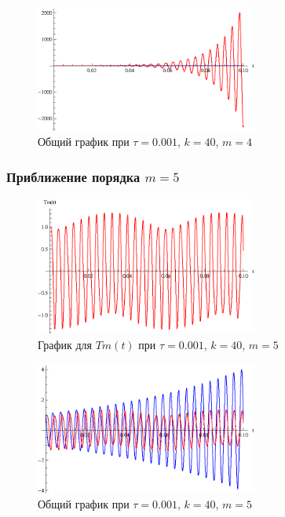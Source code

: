 \begin{figure}[h]
\begin{center}
\includegraphics[width=0.65\textwidth]{./3_results/4_9.eps}
\end{center}
\caption{Общий график при $\tau=0.001$, $k=40$, $m=4$}
\end{figure}

\newpage

\subsubsection{Приближение порядка $m=5$}

\begin{figure}[h]
\begin{center}
\includegraphics[width=0.65\textwidth]{./3_results/4_10.eps}
\end{center}
\caption{График для $Tm(t)$ при $\tau=0.001$, $k=40$, $m=5$}
\end{figure}

\begin{figure}[h]
\begin{center}
\includegraphics[width=0.65\textwidth]{./3_results/4_11.eps}
\end{center}
\caption{Общий график при $\tau=0.001$, $k=40$, $m=5$}
\end{figure}

